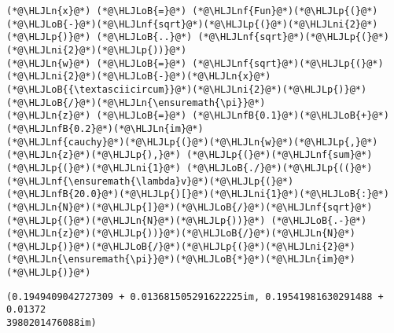 \documentclass[12pt,landscape]{article}
\newcommand{\HLJLn}[1]{#1}
\newcommand{\HLJLnf}[1]{\textcolor[RGB]{66,102,213}{#1}}
\newcommand{\HLJLnfB}[1]{\textcolor[RGB]{59,151,46}{#1}}
\newcommand{\HLJLni}[1]{\textcolor[RGB]{59,151,46}{#1}}
\newcommand{\HLJLoB}[1]{\textcolor[RGB]{102,102,102}{\textbf{#1}}}
\newcommand{\HLJLp}[1]{#1}
\begin{document}
{\begin{lstlisting}
(*@\HLJLn{x}@*) (*@\HLJLoB{=}@*) (*@\HLJLnf{Fun}@*)(*@\HLJLp{(}@*)(*@\HLJLoB{-}@*)(*@\HLJLnf{sqrt}@*)(*@\HLJLp{(}@*)(*@\HLJLni{2}@*)(*@\HLJLp{)}@*) (*@\HLJLoB{..}@*) (*@\HLJLnf{sqrt}@*)(*@\HLJLp{(}@*)(*@\HLJLni{2}@*)(*@\HLJLp{))}@*)
(*@\HLJLn{w}@*) (*@\HLJLoB{=}@*) (*@\HLJLnf{sqrt}@*)(*@\HLJLp{(}@*)(*@\HLJLni{2}@*)(*@\HLJLoB{-}@*)(*@\HLJLn{x}@*)(*@\HLJLoB{{\textasciicircum}}@*)(*@\HLJLni{2}@*)(*@\HLJLp{)}@*)(*@\HLJLoB{/}@*)(*@\HLJLn{\ensuremath{\pi}}@*)
(*@\HLJLn{z}@*) (*@\HLJLoB{=}@*) (*@\HLJLnfB{0.1}@*)(*@\HLJLoB{+}@*)(*@\HLJLnfB{0.2}@*)(*@\HLJLn{im}@*)
(*@\HLJLnf{cauchy}@*)(*@\HLJLp{(}@*)(*@\HLJLn{w}@*)(*@\HLJLp{,}@*) (*@\HLJLn{z}@*)(*@\HLJLp{),}@*) (*@\HLJLp{(}@*)(*@\HLJLnf{sum}@*)(*@\HLJLp{(}@*)(*@\HLJLni{1}@*) (*@\HLJLoB{./}@*)(*@\HLJLp{((}@*)(*@\HLJLnf{\ensuremath{\lambda}v}@*)(*@\HLJLp{(}@*)(*@\HLJLnfB{20.0}@*)(*@\HLJLp{)[}@*)(*@\HLJLni{1}@*)(*@\HLJLoB{:}@*)(*@\HLJLn{N}@*)(*@\HLJLp{]}@*)(*@\HLJLoB{/}@*)(*@\HLJLnf{sqrt}@*)(*@\HLJLp{(}@*)(*@\HLJLn{N}@*)(*@\HLJLp{))}@*) (*@\HLJLoB{.-}@*) (*@\HLJLn{z}@*)(*@\HLJLp{))}@*)(*@\HLJLoB{/}@*)(*@\HLJLn{N}@*)(*@\HLJLp{)}@*)(*@\HLJLoB{/}@*)(*@\HLJLp{(}@*)(*@\HLJLni{2}@*)(*@\HLJLn{\ensuremath{\pi}}@*)(*@\HLJLoB{*}@*)(*@\HLJLn{im}@*)(*@\HLJLp{)}@*)
\end{lstlisting}

\begin{lstlisting}
(0.1949409042727309 + 0.013681505291622225im, 0.19541981630291488 + 0.01372
3980201476088im)
\end{lstlisting}


}
\end{document}

